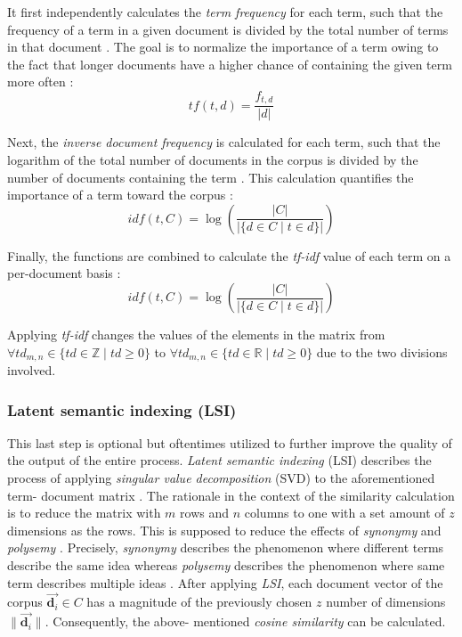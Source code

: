 \documentclass[12pt,a4paper]{report}
\begin{document}
It first independently calculates the \textit{term frequency} for each term,
such that the frequency of a term in a given document is divided by the total
number of terms in that document \cite{robertson2004tfidf}. The goal is to
normalize the importance of a term owing to the fact that longer documents have
a higher chance of containing the given term more often \cite{singhal2001ir}:
\[
  tf(t,d) = \frac{f_{t, d}}{\vert d \vert}
\]

Next, the \textit{inverse document frequency} is calculated for each term, such
that the logarithm of the total number of documents in the corpus is divided by
the number of documents containing the term \cite{robertson2004tfidf}. This
calculation quantifies the importance of a term toward the corpus \cite{singhal2001ir}:
\[
  idf(t,C) = \log \left(\frac{\vert C \vert}{\vert \{d \in C \mid t \in d\} \vert}\right)
\]

Finally, the functions are combined to calculate the \textit{tf-idf} value of
each term on a per-document basis \cite{robertson2004tfidf}:
\[
  idf(t,C) = \log \left(\frac{\vert C \vert}{\vert \{d \in C \mid t \in d\} \vert}\right)
\]

Applying \textit{tf-idf} changes the values of the elements in the matrix from
\(\forall td_{m,n} \in \{td \in \mathbb{Z} \mid td \ge 0\}\) to
\(\forall td_{m,n} \in \{td \in \mathbb{R} \mid td \ge 0\}\) due to the
two divisions involved.


\subsubsection{Latent semantic indexing (LSI)}
This last step is optional but
oftentimes utilized to further improve the quality of the output of the entire
process. \textit{Latent semantic indexing} (LSI) describes the process of
applying \textit{singular value decomposition} (SVD) to the aforementioned term-
document matrix \cite{deerwester1990lsi}. The rationale in the context of the
similarity calculation is to reduce the matrix with \(m\) rows and \(n\)
columns to one with a set amount of \(z\) dimensions as the rows. This is
supposed to reduce the effects of \textit{synonymy} and \textit{polysemy}
\cite{deerwester1990lsi}.
Precisely, \textit{synonymy} describes the phenomenon where
different terms describe the same idea \cite{press2011oxford} whereas
\textit{polysemy} describes the phenomenon where same term describes
multiple ideas \cite{press2011oxford}.
After applying \textit{LSI}, each document vector of
the corpus \(\vec{\mathbf d_i} \in C\) has a magnitude of the previously chosen
\(z\) number of dimensions \(\|\vec{\mathbf d_i}\|\). Consequently, the above-
mentioned \textit{cosine similarity} can be calculated.
\end{document}
